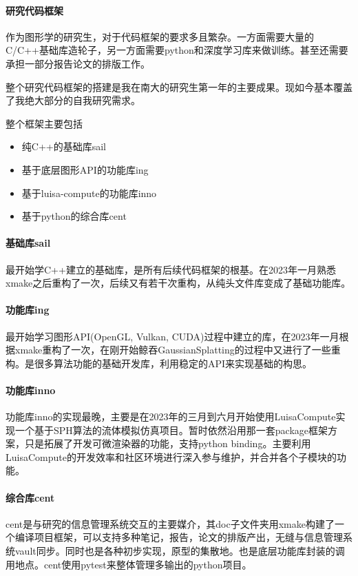 \paragraph{研究代码框架}

作为图形学的研究生，对于代码框架的要求多且繁杂。一方面需要大量的C/C++基础库造轮子，另一方面需要python和深度学习库来做训练。甚至还需要承担一部分报告论文的排版工作。

整个研究代码框架的搭建是我在南大的研究生第一年的主要成果。现如今基本覆盖了我绝大部分的自我研究需求。

整个框架主要包括

\begin{itemize}
    \item 纯C++的基础库sail
    \item 基于底层图形API的功能库ing 
    \item 基于luisa-compute的功能库inno 
    \item 基于python的综合库cent 
\end{itemize}

\paragraph{基础库sail}

最开始学C++建立的基础库，是所有后续代码框架的根基。在2023年一月熟悉xmake之后重构了一次，后续又有若干次重构，从纯头文件库变成了基础功能库。

\paragraph{功能库ing}

最开始学习图形API(OpenGL, Vulkan, CUDA)过程中建立的库，在2023年一月根据xmake重构了一次，在刚开始鲸吞GaussianSplatting的过程中又进行了一些重构。是很多算法功能的基础开发库，利用稳定的API来实现基础的构思。

\paragraph{功能库inno}

功能库inno的实现最晚，主要是在2023年的三月到六月开始使用LuisaCompute实现一个基于SPH算法的流体模拟仿真项目。暂时依然沿用那一套package框架方案，只是拓展了开发可微渲染器的功能，支持python binding。主要利用LuisaCompute的开发效率和社区环境进行深入参与维护，并合并各个子模块的功能。

\paragraph{综合库cent}

cent是与研究的信息管理系统交互的主要媒介，其doc子文件夹用xmake构建了一个编译项目框架，可以支持多种笔记，报告，论文的排版产出，无缝与信息管理系统vault同步。同时也是各种初步实现，原型的集散地。也是底层功能库封装的调用地点。cent使用pytest来整体管理多输出的python项目。
